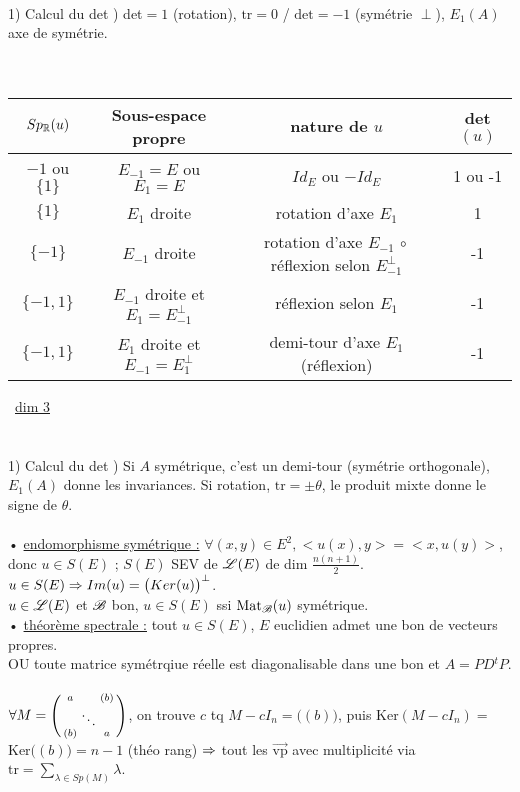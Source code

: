 \documentclass[12 pt]{book}
\begin{document}
\text{}\\
1) Calcul du det ) det$=1$ (rotation), $\text{tr}=0$ / $\text{det}=-1$ (symétrie $\perp$), $E_1(A)$ axe de symétrie.\\
\text{}\\
\text{}\\
\begin{tabular}{|c|c|c|c|}
\hline
    $Sp_{\mathbb{R}}(u)$ & Sous-espace propre & nature de $u$ & det$(u)$ \\\hline
    ${-1}$ ou $\{1\}$ & $E_{-1}=E$ ou $E_1=E$ & $Id_E$ ou $-Id_E$ & 1 ou -1\\\hline
    $\{1\}$ & $E_1$ droite & rotation d'axe $E_1$ & 1\\\hline
    $\{-1\}$ & $E_{-1}$ droite & rotation d'axe $E_{-1}\, \circ$ réflexion selon $E_{-1}^\perp$ & -1\\\hline
    $\{-1,1\}$ & $E_{-1}$ droite et $E_1 = E_{-1}^\perp$ & réflexion selon $E_1$ & -1\\\hline
    $\{-1,1\}$ & $E_{1}$ droite et $E_{-1} = E_1^\perp$ & demi-tour d'axe $E_1$ (réflexion) & -1\\\hline
\end{tabular} \ \underline{dim 3}\\
\text{}\\
\text{}\\
1) Calcul du det ) Si $A$ symétrique, c'est un demi-tour (symétrie orthogonale), $E_1(A)$ donne les invariances. Si rotation, $\text{tr}=\pm\theta$, le produit mixte donne le signe de $\theta$.\\
\text{}\\
• \underline{endomorphisme symétrique :} $\forall (x,y)\in E^2,<u(x),y>=<x,u(y)>$, donc $u\in S(E)$ ; $S(E)$ SEV de $\mathscr{L}(E)$ de dim $\frac{n(n+1)}{2}$.\\
$u\in S(E) \Rightarrow Im(u) = \big(Ker(u)\big)^\perp$.\\
$u\in\mathscr{L}(E)$ et $\mathscr{B}$ bon, $u\in S(E)$ ssi $\text{Mat}_{\mathscr{B}}(u)$ symétrique.\\
• \underline{théorème spectrale :} tout $u\in S(E)$, $E$ euclidien admet une bon de vecteurs propres.\\
OU toute matrice symétrqiue réelle est diagonalisable dans une bon et $A=PD{}^tP$.\\
\text{}\\
$\forall M =\begin{psmallmatrix} a&&(b)\\ &\ddots&\\  (b)&&a\end{psmallmatrix}$, on trouve $c$ tq $M-cI_n = \big((b)\big)$, puis Ker$(M-cI_n) = $Ker$\big((b)\big) = n-1$ (théo rang) $\Rightarrow$ tout les $\Vec{\text{vp}}$ avec multiplicité via $\text{tr} = \sum_{\lambda\in Sp(M)} \lambda$.\\
\end{document}
